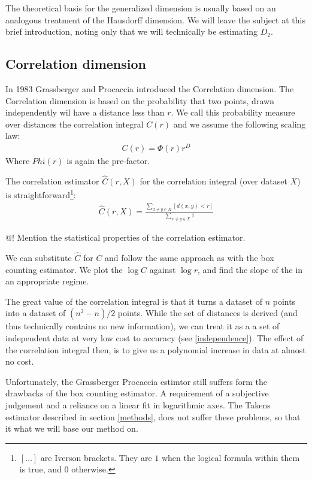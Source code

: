 \documentclass[11pt]{article}
\begin{document}
The theoretical basis for the generalized dimension is usually based on an analogous treatment of the Hausdorff dimension. We will leave the subject at this brief introduction, noting only that we will technically be estimating $D_2$.

\subsection{Correlation dimension}
\label{correlation-dimension}
In 1983 Grassberger and Procaccia \cite{grassberger1983measuring} introduced the Correlation dimension. The Correlation dimension is based on the probability that two points, drawn independently wil have a distance less than $r$. We call this probability measure over distances the correlation integral $C(r)$ and we assume the following scaling law:
\begin{align*}
C(r) = \Phi(r) r^D
\end{align*}
Where $Phi(r)$ is again the pre-factor.

The correlation estimator $\widehat{C}(r, X)$ for the correlation integral (over dataset $X$) is straightforward\footnote{$[\ldots]$ are Iverson brackets. They are $1$ when the logical formula within them is true, and $0$ otherwise.}:
\begin{align*}
\widehat{C}(r, X) = \frac{\sum_{x\neq y \in X} [d(x, y) < r]}{\sum_{x \neq y \in X} 1}
\end{align*}

@! Mention the statistical properties of the correlation estimator.

We can substitute $\widehat{C}$ for $C$ and follow the same approach as with the box counting estimator. We plot the $\log C$ against $\log r$, and find the slope of the in an appropriate regime.

The great value of the correlation integral is that it turns a dataset of $n$ points into a dataset of $(n^2 - n)/2$ points. While the set of distances is derived (and thus technically contains no new information), we can treat it as a a set of independent data at very low cost to accuracy (see \ref{independence}). The effect of the correlation integral then, is to give us a polynomial increase in data at almost no cost.

Unfortunately, the Grassberger Procaccia estimtor still suffers form the drawbacks of the box counting estimator. A requirement of a subjective judgement and a reliance on a linear fit in logarithmic axes. The Takens estimator described in section \ref{methods}, does not suffer these problems, so that it what we will base our method on. 
\end{document}
